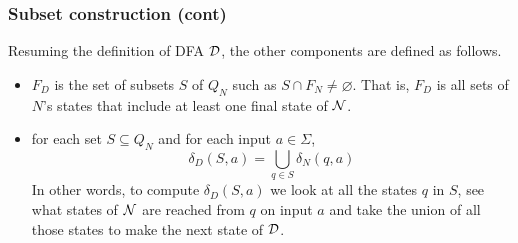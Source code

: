 % 
\begin{frame}
\frametitle{Subset construction (cont)}

Resuming the definition of DFA \({\cal D}\), the other components are
defined as follows.
\begin{itemize}

  \item \(F_D\) is the set of subsets \(S\) of \(Q_N\) such as \(S
  \cap F_N \neq \varnothing\). That is, \(F_D\) is all sets of \(N\)'s
  states that include at least one final state of \({\cal N}\).

  \item for each set \(S \subseteq Q_N\) and for each input \(a \in
  \Sigma\),
  \[
    \delta_D(S, a) = \bigcup_{q \in S}{\delta_N (q, a)}
  \]
  In other words, to compute \(\delta_D (S, a)\) we look at all the
  states \(q\) in \(S\), see what states of \({\cal N}\) are reached
  from \(q\) on input \(a\) and take the union of all those states to
  make the next state of \({\cal D}\).

\end{itemize}

\end{frame}

